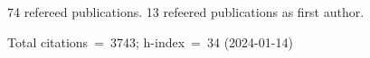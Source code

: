 74 refereed publications. 13 refeered publications as first author.

Total citations~=~3743; h-index~=~34 (2024-01-14)